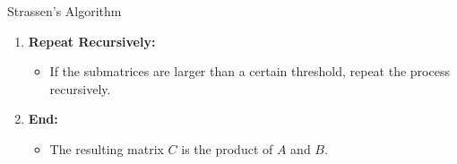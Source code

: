 \begin{usage}[]{Strassen's Algorithm}
\begin{enumerate}
        \item \textbf{Repeat Recursively:}
              \begin{itemize}
                  \item If the submatrices are larger than a certain threshold, repeat the process recursively.
              \end{itemize}

        \item \textbf{End:}
              \begin{itemize}
                  \item The resulting matrix \(C\) is the product of \(A\) and \(B\).
              \end{itemize}
    \end{enumerate}
\end{usage}
